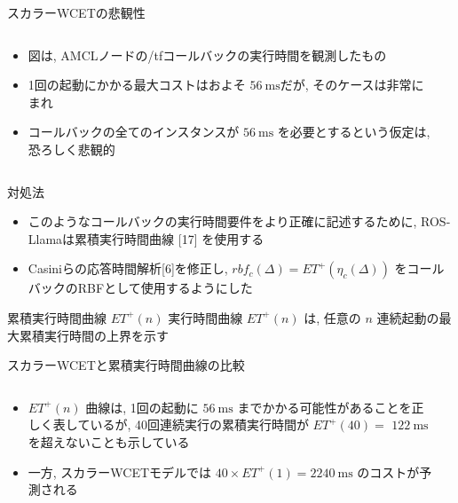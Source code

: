 \begin{frame}{スカラーWCETの悲観性}
    \begin{columns}
        \begin{column}{0.5\textwidth}
            \begin{itemize}
                \item 図は, AMCLノードの/tfコールバックの実行時間を観測したもの
                \item 1回の起動にかかる最大コストはおよそ $56 \mathrm{~ms}$だが, そのケースは非常にまれ
                \item コールバックの全てのインスタンスが $56 \mathrm{~ms}$ を必要とするという仮定は, 恐ろしく悲観的
            \end{itemize}
        \end{column}
        \begin{column}{0.5\textwidth}
        \end{column}
    \end{columns}
\end{frame}

\begin{frame}{対処法}
    \begin{itemize}
        \item このようなコールバックの実行時間要件をより正確に記述するために, ROS-Llamaは累積実行時間曲線 [17] を使用する
        \item Casiniらの応答時間解析[6]を修正し, $r b f_{c}(\Delta)=E T^{+}\left(\eta_{c}(\Delta)\right)$ をコールバックのRBFとして使用するようにした
    \end{itemize}
    \begin{block}{累積実行時間曲線 $E T^{+}(n)$}
        実行時間曲線 $E T^{+}(n)$ は, 任意の $n$ 連続起動の最大累積実行時間の上界を示す
    \end{block}
\end{frame}

\begin{frame}{スカラーWCETと累積実行時間曲線の比較}
    \begin{columns}
        \begin{column}{0.5\textwidth}
            \begin{itemize}
                \item $E T^{+}(n)$ 曲線は, 1回の起動に $56 \mathrm{~ms}$ までかかる可能性があることを正しく表しているが, 40回連続実行の累積実行時間が $E T^{+}(40)=$  $122 \mathrm{~ms}$ を超えないことも示している
                \item 一方, スカラーWCETモデルでは $40 \times E T^{+}(1)=2240 \mathrm{~ms}$ のコストが予測される
            \end{itemize}
        \end{column}
        \begin{column}{0.5\textwidth}
        \end{column}
    \end{columns}
\end{frame}


